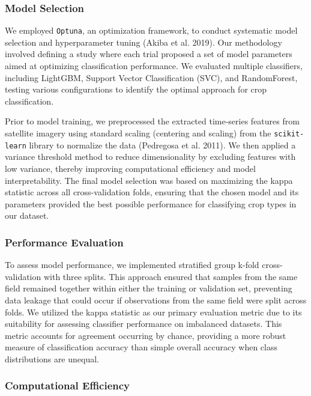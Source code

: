 \documentclass[
  journal,
  twocolumn]{IEEEtran}
\begin{document}
\hypertarget{model-selection}{%
\subsubsection{Model Selection}\label{model-selection}}

We employed \texttt{Optuna}, an optimization framework, to conduct
systematic model selection and hyperparameter tuning (Akiba et al.
2019). Our methodology involved defining a study where each trial
proposed a set of model parameters aimed at optimizing classification
performance. We evaluated multiple classifiers, including LightGBM,
Support Vector Classification (SVC), and RandomForest, testing various
configurations to identify the optimal approach for crop classification.

Prior to model training, we preprocessed the extracted time-series
features from satellite imagery using standard scaling (centering and
scaling) from the \texttt{scikit-learn} library to normalize the data
(Pedregosa et al. 2011). We then applied a variance threshold method to
reduce dimensionality by excluding features with low variance, thereby
improving computational efficiency and model interpretability. The final
model selection was based on maximizing the kappa statistic across all
cross-validation folds, ensuring that the chosen model and its
parameters provided the best possible performance for classifying crop
types in our dataset.

\hypertarget{performance-evaluation}{%
\subsubsection{Performance Evaluation}\label{performance-evaluation}}

To assess model performance, we implemented stratified group k-fold
cross-validation with three splits. This approach ensured that samples
from the same field remained together within either the training or
validation set, preventing data leakage that could occur if observations
from the same field were split across folds. We utilized the kappa
statistic as our primary evaluation metric due to its suitability for
assessing classifier performance on imbalanced datasets. This metric
accounts for agreement occurring by chance, providing a more robust
measure of classification accuracy than simple overall accuracy when
class distributions are unequal.

\hypertarget{computational-efficiency}{%
\subsubsection{Computational
Efficiency}\label{computational-efficiency}}
\end{document}
